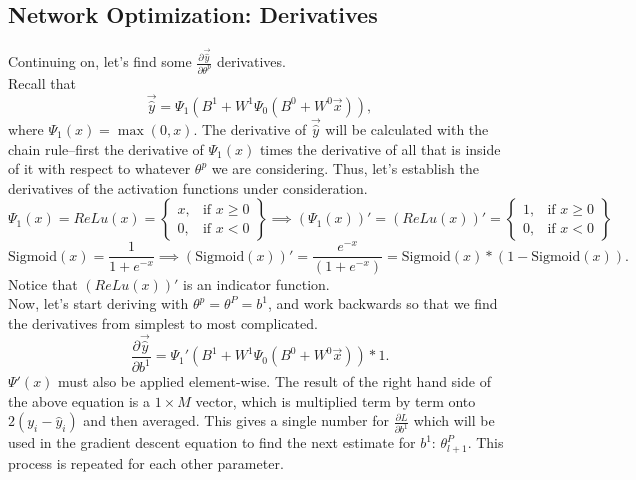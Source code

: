 \documentclass[reqno,14pt]{amsart}
\theoremstyle{plain}
\theoremstyle{definition}
\theoremstyle{remark}
\begin{document}
\subsection{Network Optimization: Derivatives}
Continuing on, let's find some $\frac{\partial \overrightarrow{\hat{y}}}{\partial \theta^p}$ derivatives.\\
Recall that 
\begin{equation}
    \overrightarrow{\hat{y}} = \Psi_1( B^1 + W^1 \Psi_0( B^0 + W^0 \overrightarrow{x} ) ),
\end{equation}
where $\Psi_1(x) = \max(0,x)$. The derivative of $\overrightarrow{\hat{y}}$ will be calculated with the chain rule--first the derivative of $\Psi_1(x)$ times the derivative of all that is inside of it with respect to whatever $\theta^p$ we are considering. Thus, let's establish the derivatives of the activation functions under consideration.
\begin{equation}
    \Psi_1(x) = ReLu(x) = 
    \left\{ 
    \begin{array}{cc}
        x, & \text{if } x \ge 0  \\
        0, & \text{if } x < 0
    \end{array}
    \right\}
    \implies
    (\Psi_1(x))' = (ReLu(x))' =
    \left\{ 
    \begin{array}{cc}
        1, & \text{if } x \ge 0  \\
        0, & \text{if } x < 0
    \end{array}
    \right\}
\end{equation}
\begin{equation}
    \text{Sigmoid}(x) = \frac{1}{1+e^{-x}} \implies (\text{Sigmoid}(x))'= \frac{e^{-x}}{(1+e^{-x})} = \text{Sigmoid}(x)*(1-\text{Sigmoid}(x)).
\end{equation}
Notice that $(ReLu(x))'$ is an indicator function.\\

Now, let's start deriving with $\theta^p = \theta^P = b^1$, and work backwards so that we find the derivatives from simplest to most complicated.
\begin{equation}
    \frac{\partial \overrightarrow{\hat{y}}}{\partial b^1} = \Psi_1'(B^1 + W^1 \Psi_0( B^0 + W^0 \overrightarrow{x} ))*1.
\end{equation}
$\Psi'(x)$ must also be applied element-wise. The result of the right hand side of the above equation is a $1 \times M$ vector, which is multiplied term by term onto $2(y_i - \hat{y}_i)$ and then averaged. This gives a single number for $\frac{\partial L}{\partial b^1}$ which will be used in the gradient descent equation to find the next estimate for $b^1$: $\theta^{P}_{l+1}$. This process is repeated for each other parameter.\\
\end{document}
